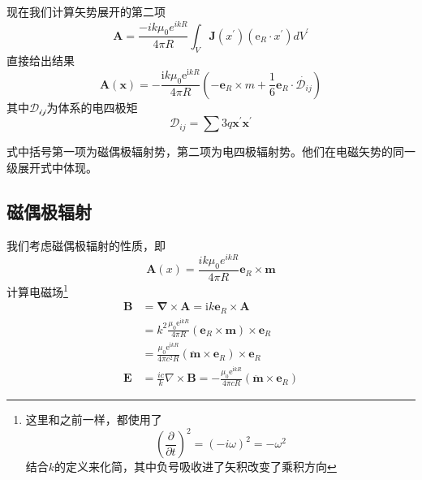         现在我们计算矢势展开的第二项
        \begin{equation}
            \boldsymbol{A} = \frac{- i k \mu_0 e^{ikR}}{4 \pi R}\int_V \boldsymbol{J}(x^\prime)(\mathrm{e}_R \cdot x^\prime) dV^\prime
        \end{equation}
        直接给出结果
        \begin{equation}
            \boldsymbol{A}(\boldsymbol{x})=-\frac{\mathrm{i} k \mu_{0} \mathrm{e}^{\mathrm{i} k R}}{4 \pi R}\left(-\boldsymbol{e}_{R} \times m+\frac{1}{6} \boldsymbol{e}_{R} \cdot \dot{\mathscr{D}_{ij}}\right)
        \end{equation}
        其中$\mathscr{D_{ij}}$为体系的电四极矩\[\mathscr{D}_{ij}=\sum3q\boldsymbol{x^\prime}\boldsymbol{x^\prime}\]

        式中括号第一项为磁偶极辐射势，第二项为电四极辐射势。他们在电磁矢势的同一级展开式中体现。
    \subsection{磁偶极辐射}
        我们考虑磁偶极辐射的性质，即
        \begin{equation}
            \boldsymbol{A}(x) = \frac{ik \mu_0 e^{ik R}}{4 \pi R}\boldsymbol{e}_R \times \boldsymbol{m}
        \end{equation}
        计算电磁场\footnote{这里和之前一样，都使用了\[( \frac{\partial }{\partial t})^2=(-i \omega)^2=-\omega^2\]结合$k$的定义来化简，其中负号吸收进了矢积改变了乘积方向}
        \begin{equation}
            \begin{aligned}
            \boldsymbol{B} &=\boldsymbol{\nabla} \times \boldsymbol{A}=\mathrm{i} k \boldsymbol{e}_{R} \times \boldsymbol{A} \\
            &=k^{2} \frac{\mu_{0} \mathrm{e}^{\mathrm{i} k R}}{4 \pi R}\left(\boldsymbol{e}_{R} \times \boldsymbol{m}\right) \times \boldsymbol{e}_{R} \\
            &=\frac{\mu_{0} \mathrm{e}^{\mathrm{i} k R}}{4 \pi c^{2} R}\left(\ddot{\boldsymbol{m}} \times \boldsymbol{e}_{R}\right) \times \boldsymbol{e}_{R} \\
            \boldsymbol{E} &=\frac{i c}{k} \nabla \times \boldsymbol{B} =-\frac{\mu_{0} \mathrm{e}^{\mathrm{i} k R}}{4 \pi c R}\left(\ddot{\boldsymbol{m}} \times \boldsymbol{e}_{R}\right)
            \end{aligned}
        \end{equation}

